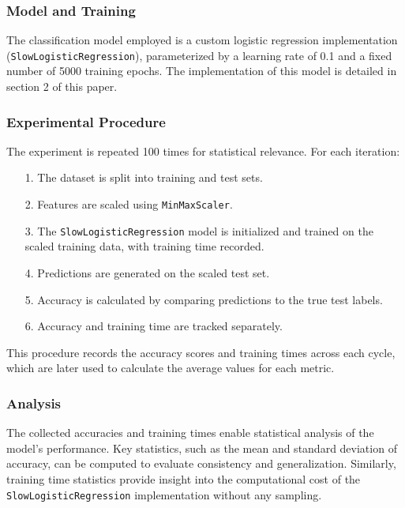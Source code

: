 \documentclass{article}
\theoremstyle{plain}
\theoremstyle{definition}
\theoremstyle{remark}
\begin{document}
\subsubsection{Model and Training}

The classification model employed is a custom logistic regression implementation (\texttt{SlowLogisticRegression}), parameterized by a learning rate of 0.1 and a fixed number of 5000 training epochs. The implementation of this model is detailed in section 2 of this paper.


\subsubsection{Experimental Procedure}

The experiment is repeated 100 times for statistical relevance. For each iteration:

\begin{itemize}
 \item [1.] The dataset is split into training and test sets.
 \item [2.] Features are scaled using \texttt{MinMaxScaler}.
 \item [3.] The \texttt{SlowLogisticRegression} model is initialized and trained on the scaled training data, with training time recorded.
 \item [4.] Predictions are generated on the scaled test set.
 \item [5.] Accuracy is calculated by comparing predictions to the true test labels.
 \item [6.] Accuracy and training time are tracked separately.
\end{itemize}

This procedure records the accuracy scores and training times across each cycle, which are later used to calculate the average values for each metric.


\subsubsection{Analysis}

The collected accuracies and training times enable statistical analysis of the model's performance. Key statistics, such as the mean and standard deviation of accuracy, can be computed to evaluate consistency and generalization. Similarly, training time statistics provide insight into the computational cost of the \texttt{SlowLogisticRegression} implementation without any sampling.
\end{document}
